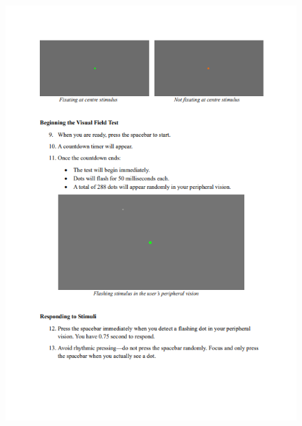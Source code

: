 \documentclass{l4proj}
\begin{document}
\begin{appendices}
\begin{figure}
    \centering
    \includegraphics[width=1\linewidth]{images//VFT study/p4.png}
\end{figure}
\clearpage


\end{appendices}
\end{document}
